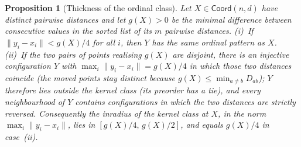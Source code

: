 \documentclass[11pt,a4paper]{article}
\theoremstyle{plain}
\newtheorem{proposition}[theorem]{Proposition}
\theoremstyle{definition}
\theoremstyle{remark}
\newcommand{\Fcoord}{\mathsf{Coord}}
\begin{document}
\begin{proposition}[Thickness of the ordinal class]\label{prop:inradius}
Let $X\in\Fcoord(n,d)$ have distinct pairwise distances and let $g(X)>0$ be the minimal difference between consecutive values in the sorted list of its $m$ pairwise distances. (i)~If $\lVert y_i-x_i\rVert<g(X)/4$ for all $i$, then $Y$ has the same ordinal pattern as $X$. (ii)~If the two pairs of points realising $g(X)$ are disjoint, there is an injective configuration $Y$ with $\max_i\lVert y_i-x_i\rVert=g(X)/4$ in which those two distances coincide (the moved points stay distinct because $g(X)\le\min_{a\ne b}D_{ab}$); $Y$ therefore lies outside the kernel class (its preorder has a tie), and every neighbourhood of $Y$ contains configurations in which the two distances are strictly reversed. Consequently the inradius of the kernel class at $X$, in the norm $\max_i\lVert y_i-x_i\rVert$, lies in $[g(X)/4,\,g(X)/2]$, and equals $g(X)/4$ in case~(ii).
\end{proposition}
\end{document}
